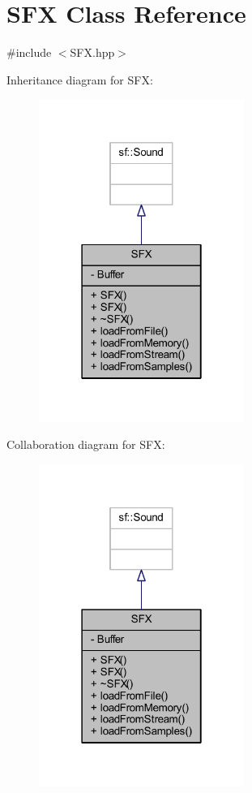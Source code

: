 \hypertarget{class_s_f_x}{\section{S\-F\-X Class Reference}
\label{class_s_f_x}
}


{\ttfamily \#include $<$S\-F\-X.\-hpp$>$}



Inheritance diagram for S\-F\-X\-:\nopagebreak
\begin{figure}[H]
\begin{center}
\leavevmode
\includegraphics[width=190pt]{class_s_f_x__inherit__graph}
\end{center}
\end{figure}


Collaboration diagram for S\-F\-X\-:\nopagebreak
\begin{figure}[H]
\begin{center}
\leavevmode
\includegraphics[width=190pt]{class_s_f_x__coll__graph}
\end{center}
\end{figure}
